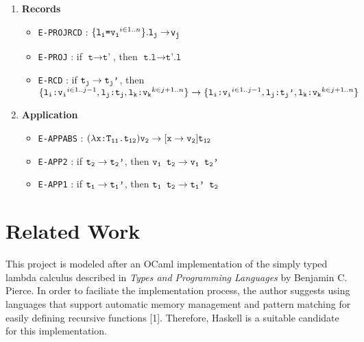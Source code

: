\documentclass[fleqn, 11pt]{article}
\begin{document}
\begin{enumerate}
    \item \textbf{Records}
    \begin{itemize}
        \item \texttt{E-PROJRCD} : $\{\texttt{l\textsubscript{i}=v\textsubscript{i}}^{i \in 1..n}\}.\texttt{l\textsubscript{j}} 
        \rightarrow $\texttt{v\textsubscript{j}}
        \item \texttt{E-PROJ} : if $\texttt{t} \rightarrow \texttt{t'}$, then 
        $\texttt{t.l} \rightarrow \texttt{t'.l}$
        \item \texttt{E-RCD} : if $\texttt{t\textsubscript{j}} \rightarrow \texttt{t\textsubscript{j}'}$, then \\
        $\{\texttt{l\textsubscript{i}:v\textsubscript{i}}^{i \in 1..j-1},\texttt{l\textsubscript{j}:t\textsubscript{j}}, 
        \texttt{l\textsubscript{k}:v\textsubscript{k}}^{k \in j+1..n}\} \rightarrow 
        \{\texttt{l\textsubscript{i}:v\textsubscript{i}}^{i \in 1..j-1},\texttt{l\textsubscript{j}:t\textsubscript{j}'}, 
        \texttt{l\textsubscript{k}:v\textsubscript{k}}^{k \in j+1..n}\}$ 
    \end{itemize}

    \item \textbf{Application}
    \begin{itemize}
        \item \texttt{E-APPABS} : $(\lambda \texttt{x:T\textsubscript{11}.t\textsubscript{12}})\texttt{v\textsubscript{2}} \rightarrow 
        [\texttt{x} \rightarrow \texttt{v\textsubscript{2}}]\texttt{t\textsubscript{12}}$
        \item \texttt{E-APP2} : if $\texttt{t\textsubscript{2}} \rightarrow \texttt{t\textsubscript{2}'}$, then 
        $\texttt{v\textsubscript{1} t\textsubscript{2}} \rightarrow \texttt{v\textsubscript{1} t\textsubscript{2}'}$
        \item \texttt{E-APP1} : if $\texttt{t\textsubscript{1}} \rightarrow \texttt{t\textsubscript{1}'}$, then 
        $\texttt{t\textsubscript{1} t\textsubscript{2}} \rightarrow \texttt{t\textsubscript{1}' t\textsubscript{2}}$
    \end{itemize}
\end{enumerate}

\section{Related Work}

This project is modeled after an OCaml implementation of the simply typed lambda calculus described in \textit{Types and Programming 
Languages} by Benjamin C. Pierce. In order to faciliate the implementation process, the author suggests using languages that support 
automatic memory management and pattern matching for easily defining recursive functions [1]. Therefore, Haskell is a suitable candidate 
for this implementation. 
\end{document}
